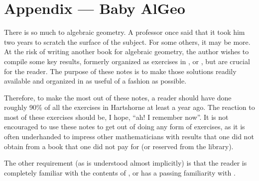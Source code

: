 \appendix
\chapter{Appendix --- Baby AlGeo}

There is so much to algebraic geometry. A professor once said that 
it took him two years to scratch the surface of the subject. For 
some others, it may be more. At the risk of writing another book
for algebraic geometry, the author wishes to compile some key 
results, formerly organized as exercises in \cite{Hart}, 
\cite{Liu} or \cite{Mum}, but are crucial for the reader. The 
purpose of these notes is to make those solutions readily 
available and organized in as useful of a fashion as possible.

Therefore, to make the most out of these notes, a reader should
have done roughly 90\% of all the exercises in Hartshorne at least 
a year ago. The reaction to most of these exercises should be, I
hope, ``ah! I remember now''. It is not encouraged to use these 
notes to get out of doing any form of exercises, as it is often
underhanded to impress other mathematicians with results that one
did not obtain from a book that one did not pay for (or reserved
from the library).

The other requirement (as is understood almost implicitly) is that
the reader is completely familiar with the contents of \cite{AM},
or has a passing familiarity with \cite{MatsCA}.






